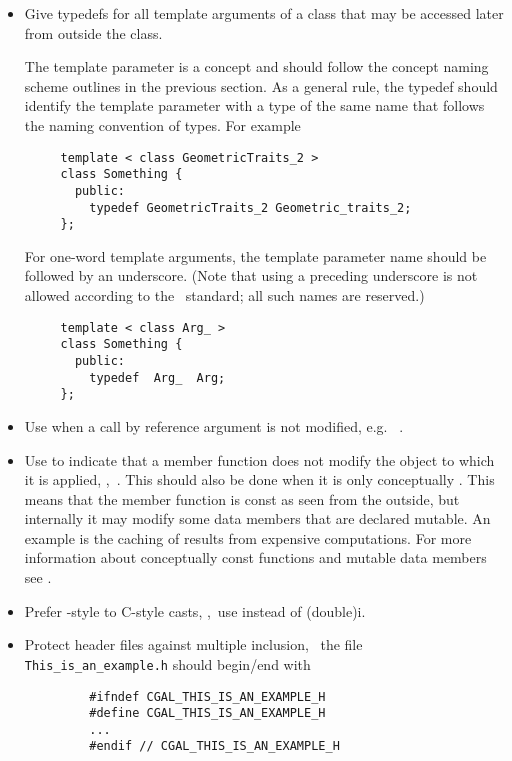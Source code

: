 \begin{itemize}
\item Give typedefs for all template arguments of a class that may be
      accessed later from outside the class.

     The template parameter is a concept and should follow the concept naming
     scheme outlines in the previous section.  As a general rule, the typedef
     should identify the template parameter with a type of the same name that
     follows the naming convention of types.  For example
     \begin{verbatim}
     template < class GeometricTraits_2 >
     class Something {
       public:
         typedef GeometricTraits_2 Geometric_traits_2;
     };
     \end{verbatim}
     For one-word template arguments, the template parameter name should be
     followed by an underscore.  (Note that using a preceding
     underscore is not allowed according to the \CC\ standard; all such names
     are reserved.)%
     \begin{verbatim}
     template < class Arg_ >
     class Something {
       public:
         typedef  Arg_  Arg;
     };
     \end{verbatim}
\item Use  when a call by reference argument is not
      modified, e.g.~%
     .
\item Use  to indicate that a member function does not
      modify the object to which it is applied,
      \eg,~. This should also be
      done when it is only conceptually %
      .
      This means that the member function  is {\ccFont const} as seen from
      the outside, but internally it may modify some data members
      that are declared {\ccFont mutable}. An example
      is the caching of results from expensive computations.  For more
      information about conceptually {\ccFont const} functions and mutable data
      members see \cite{cgal:m-ec-97}.
\item Prefer \CC-style to C-style casts,%
      \eg,~use  instead of {\ccFont (double)i}.
\item Protect header files against multiple inclusion,
      \eg~the file {\tt This\_is\_an\_example.h} should begin/end with
      \begin{verbatim}
         #ifndef CGAL_THIS_IS_AN_EXAMPLE_H
         #define CGAL_THIS_IS_AN_EXAMPLE_H
         ...
         #endif // CGAL_THIS_IS_AN_EXAMPLE_H
     \end{verbatim}
\end{itemize}

